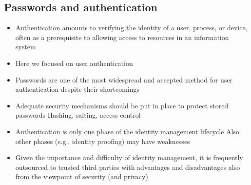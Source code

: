 \documentclass[12pt, a4paper]{article}
\begin{document}
\subsection{Passwords and authentication}
\begin{itemize}
    \item Authentication amounts to verifying the identity of a user, process, or device, often
    as a prerequisite to allowing access to resources in an information system
    \item Here we focused on user authentication
    \item Passwords are one of the most widespread and accepted method for user
    authentication despite their shortcomings
    \item Adequate security mechanisms should be put in place to protect stored passwords
    \subitem Hashing, salting, access control
    \item Authentication is only one phase of the identity management lifecycle
    \subitem Also other phases (e.g., identity proofing) may have weaknesses
    \item Given the importance and difficulty of identity management, it is frequently
    outsourced to trusted third parties with advantages and disadvantages also from
    the viewpoint of security (and privacy)
\end{itemize}
\end{document}
